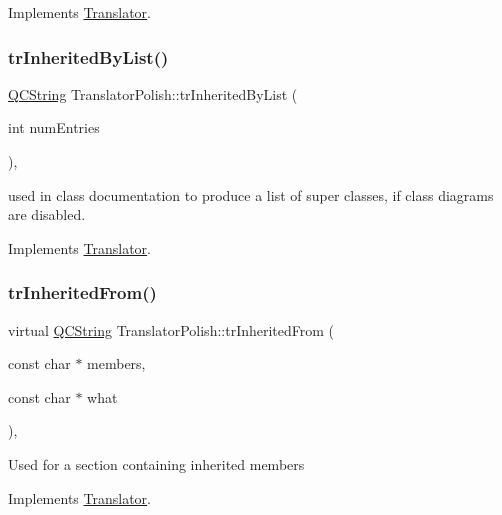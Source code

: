 Implements \mbox{\hyperlink{class_translator}{Translator}}.

\mbox{\label{class_translator_polish_a2ee269237103a5832d56224baec80bef}} 
\subsubsection{\texorpdfstring{trInheritedByList()}{trInheritedByList()}}
{\footnotesize\ttfamily \mbox{\hyperlink{class_q_c_string}{Q\+C\+String}} Translator\+Polish\+::tr\+Inherited\+By\+List (\begin{DoxyParamCaption}\item[{int}]{num\+Entries }\end{DoxyParamCaption})\hspace{0.3cm}{\ttfamily [inline]}, {\ttfamily [virtual]}}

used in class documentation to produce a list of super classes, if class diagrams are disabled. 

Implements \mbox{\hyperlink{class_translator}{Translator}}.

\mbox{\label{class_translator_polish_a38f7cb734efe1c3285ca306ccd6207b5}} 
\subsubsection{\texorpdfstring{trInheritedFrom()}{trInheritedFrom()}}
{\footnotesize\ttfamily virtual \mbox{\hyperlink{class_q_c_string}{Q\+C\+String}} Translator\+Polish\+::tr\+Inherited\+From (\begin{DoxyParamCaption}\item[{const char $\ast$}]{members,  }\item[{const char $\ast$}]{what }\end{DoxyParamCaption})\hspace{0.3cm}{\ttfamily [inline]}, {\ttfamily [virtual]}}

Used for a section containing inherited members 

Implements \mbox{\hyperlink{class_translator}{Translator}}.

